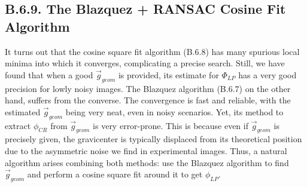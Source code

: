 \documentclass[11pt, a4paper, twoside]{article} %
\begin{document}
\vspace{-0.2cm}

\subsection*{B.6.9. The Blazquez + RANSAC Cosine Fit Algorithm}\vspace{-0.15cm}
It turns out that the cosine square fit algorithm (B.6.8) has many spurious local minima into which it converges, complicating a precise search. Still, we have found that when a good $\vec{g}_{geom}$ is provided, its estimate for $\Phi_{LP}$ has a very good precision for lowly noisy images. The Blazquez algorithm (B.6.7) on the other hand, suffers from the converse. The convergence is fast and reliable, with the estimated $\vec{g}_{geom}$ being very neat, even in noisy scenarios. Yet, its method to extract $\phi_{CR}$ from $\vec{g}_{geom}$ is very error-prone. This is because even if $\vec{g}_{geom}$ is precisely given, the gravicenter is typically displaced from its theoretical position due to the asymmetric noise we find in experimental images. Thus, a natural algorithm arises combining both methods: use the Blazquez algorithm to find $\vec{g}_{geom}$ and perform a cosine square fit around it to get $\phi_{LP}$.\vspace{-0.07cm}
\end{document}
